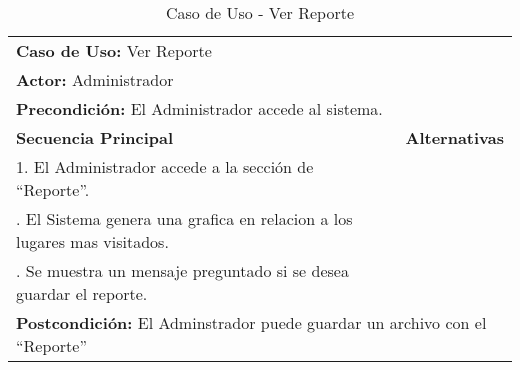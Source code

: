 \begin{table}[H]
  \begin{center}
    \begin{tabularx}{0.75\textwidth}{ X X  }
      \toprule
      \multicolumn{2}{l}{\textbf{Caso de Uso:} Ver Reporte} \\
      \multicolumn{2}{l}{\textbf{Actor:} Administrador} \\
      \multicolumn{2}{l}{\textbf{Precondición:} El Administrador accede al sistema.} \\
      \addlinespace
      \textbf{Secuencia Principal} & \textbf{Alternativas} \\
      \midrule
      1. El Administrador accede a la sección de ``Reporte''. \\
      \addlinespace
      2. El Sistema genera una grafica en relacion a los lugares mas visitados.  \\
      \addlinespace
      3. Se muestra un mensaje preguntado si se desea guardar el reporte.\\

      \midrule
      \multicolumn{2}{l}{\textbf{Postcondición:} El Adminstrador puede guardar un archivo con el ``Reporte''} \\

      \bottomrule
    \end{tabularx}
    \caption{Caso de Uso - Ver Reporte}
    \label{tab:cu_ver_reporte}
  \end{center}
\end{table}

